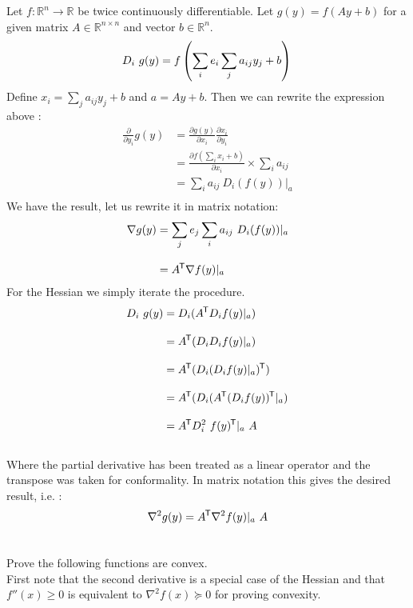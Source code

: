 \documentclass{article}
\newcommand*{\tran}{^{\mkern-1.5mu\mathsf{T}}}%
\begin{document}
		\section{}
		Let $f : \mathbb R^n \rightarrow \mathbb R$ be twice continuously differentiable. Let $g(y) = f(Ay + b)$ for a given matrix $A \in \mathbb R^{n\times n}$ and vector $b \in \mathbb{R}^n$. 
		\begin{equation}
			D_i \ g(y) = f\left(\sum_i e_i \sum_j a_{ij} y_{j} + b \right)\\
		\end{equation}
		Define $x_i = \sum_j a_{ij}y_j + b$ and $a = Ay +b$. Then we can rewrite the expression above :
		\begin{align}
			\frac{\partial}{\partial y_i} g(y) &= \frac{\partial g(y)}{\partial x_i} \frac{\partial x_i}{\partial y_i}\\[2ex]
			&= \frac{\partial f (\sum_i x_i +b)}{\partial x_i} \times \sum_i a_{ij}\\
			&= \sum_i a_{ij}  \ D_i(f(y))\vert _a\\
		\end{align}
		We have the result, let us rewrite it in matrix notation:
		\begin{align*}
			\nabla g(y) &= \sum_j e_j \sum_i a_{ij} \ D_i(f(y))\vert_a\\[2ex]
			& = A\tran \nabla f(y)\vert _a
		\end{align*}
		For the Hessian we simply iterate the procedure.
		\begin{align}
			D_i \ g(y) &= D_i (A\tran D_i f(y)\vert _a)\\[2ex]
			&= A\tran (D_i D_i f(y) \vert_a)\\[2ex]
			&= A\tran ( D_i (D_i f(y)\vert_a) \tran)\\[2ex]
			&= A\tran (D_i (A\tran (D_i f(y))\tran \vert _a )\\[2ex]
			&= A\tran D_i ^2 \ f(y)\tran \vert_a  \ A
		\end{align}\\
		Where the partial derivative has been treated as a linear operator and the transpose was taken for conformality. In matrix notation this gives the desired result, i.e. :
		\begin{equation}
			\nabla ^2 g(y) = A\tran \nabla ^2 f(y) \vert _a  \ A
		\end{equation}
		
		\clearpage
		
		\section{}
		Prove the following functions are convex. \\
		First note that the second derivative is a special case of the Hessian and that $f''(x) \geq 0$ is equivalent to $\nabla ^2 f(x) \succeq 0$ for proving convexity. 
		
\end{document}
